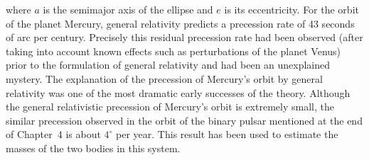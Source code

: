 where \(a\) is the semimajor axis of the ellipse and \(e\) is its eccentricity.
For the orbit of the planet Mercury, general relativity predicts a precession rate
of 43 seconds of arc per century. Precisely this residual precession rate had been
observed (after taking into account known effects such as perturbations of the
planet Venus) prior to the formulation of general relativity and had been an
unexplained mystery. The explanation of the precession of Mercury's orbit by
general relativity was one of the most dramatic early successes of the theory.
Although the general relativistic precession of Mercury's orbit is extremely
small, the similar precession observed in the orbit of the binary pulsar mentioned
at the end of Chapter~4 is about \(4^\circ\) per year. This result has been used
to estimate the masses of the two bodies in this system.

